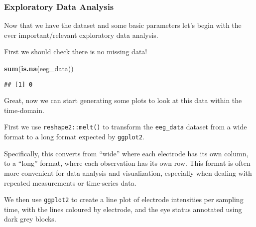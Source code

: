 \documentclass[
]{article}
\newenvironment{Shaded}{\begin{snugshade}}{\end{snugshade}}
\newcommand{\FunctionTok}[1]{\textcolor[rgb]{0.13,0.29,0.53}{\textbf{#1}}}
\newcommand{\NormalTok}[1]{#1}
\begin{document}
\subsubsection{Exploratory Data
Analysis}\label{exploratory-data-analysis}

Now that we have the dataset and some basic parameters let's begin with
the ever important/relevant exploratory data analysis.

First we should check there is no missing data!

\begin{Shaded}
\begin{Highlighting}[]
\FunctionTok{sum}\NormalTok{(}\FunctionTok{is.na}\NormalTok{(eeg\_data))}
\end{Highlighting}
\end{Shaded}

\begin{verbatim}
## [1] 0
\end{verbatim}

Great, now we can start generating some plots to look at this data
within the time-domain.

First we use \texttt{reshape2::melt()} to transform the
\texttt{eeg\_data} dataset from a wide format to a long format expected
by \texttt{ggplot2}.

Specifically, this converts from ``wide'' where each electrode has its
own column, to a ``long'' format, where each observation has its own
row. This format is often more convenient for data analysis and
visualization, especially when dealing with repeated measurements or
time-series data.

We then use \texttt{ggplot2} to create a line plot of electrode
intensities per sampling time, with the lines coloured by electrode, and
the eye status annotated using dark grey blocks.
\end{document}

